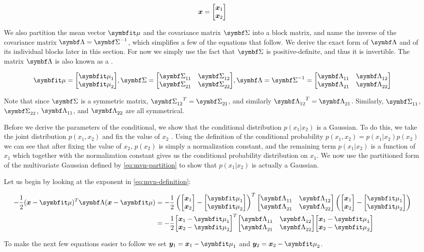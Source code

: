 \begin{equation}
  {\boldsymbol{x}} = {\begin{bmatrix} {\boldsymbol{x}}_1 \\ {\boldsymbol{x}}_2 \end{bmatrix}}
\end{equation}

We also partition the mean vector $\vmu$ and the covariance matrix $\mSigma$
into a block matrix, and name the inverse of the covariance matrix $\mLambda =
\mSigma^{-1}$, which simplifies a few of the equations that follow. We
derive the exact form of $\mLambda$ and of its individual blocks later in this
section. For now we simply use the fact that $\mSigma$ is positive-definite,
and thus it is invertible. The matrix $\mLambda$ is also known as a
.

\begin{equation}
  \vmu = \partmu,
  \mSigma = \partsigma, \mLambda = \mSigma^{-1} = \partlambda \label{eq:mvn-partition}
\end{equation}

Note that since $\mSigma$ is a symmetric matrix, $\ms{12}^T = \ms{21}$, and
similarly $\ml{12}^T = \ml{21}$. Similarly, $\ms{11}$, $\ms{22}$, $\ml{11}$,
and $\ml{22}$ are all symmetrical.

Before we derive the parameters of the conditional, we show that the
conditional distribution $p(x_1 | x_2)$ is a Gaussian. To do this, we take the
joint distribution $p(x_1, x_2)$ and fix the value of $x_2$
\citep{bishop2016pattern}. Using the definition of the conditional probability
$p(x_1, x_2) = p(x_1 | x_2) p(x_2)$ we can see that after fixing the value of
$x_2$, $p(x_2)$ is simply a normalization constant, and the remaining term
$p(x_1 | x_2)$ is a function of $x_1$ which together with the normalization
constant gives us the conditional probability distribution on $x_1$.
We now use the partitioned form of the multivariate Gaussian defined by
\autoref{eq:mvn-partition} to show that $p(x_1 | x_2)$ is actually a Gaussian.

Let us begin by looking at the exponent in \autoref{eq:mvn-definition}:

\begin{align}
  -\frac{1}{2} (\vx - \vmu)^T \mLambda (\vx - \vmu) &=
  -\frac{1}{2} \left(\partx - \partmu \right)^T \partlambda \left(\partx - \partmu \right) \\
                                                    &= -\frac{1}{2} \partxmu^T \partlambda \partxmu
\end{align}

To make the next few equations easier to follow we set $\vy_1 = \vx_1 - \vmu_1$ and $\vy_2 = \vx_2 - \vmu_2$.

